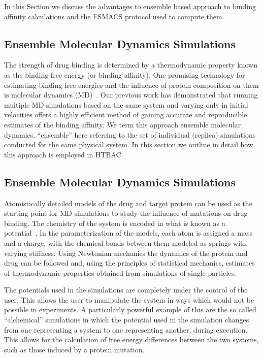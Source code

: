 In this Section we discuss the advantages to ensemble based approach to
binding affinity calculations and the ESMACS protocol used to compute them.

\subsection{Ensemble Molecular Dynamics Simulations}


The strength of drug binding is determined by a thermodynamic property known
as the binding free energy (or binding affinity). One promising technology for
estimating binding free energies and the influence of protein composition on
them is molecular dynamics (MD)~\cite{Karplus2005}. Our previous work
\cite{Sadiq2010, Wan2011} has demonstrated that running multiple MD
simulations based on the same system and varying only in initial velocities
offers a highly efficient method of gaining accurate and reproducible
estimates of the binding affinity. We term this approach ensemble molecular
dynamics, ``ensemble'' here referring to the set of individual (replica)
simulations conducted for the same physical system. In this section we outline
in detail how this approach is employed in HTBAC.

\subsection{Ensemble Molecular Dynamics Simulations}

Atomistically detailed models of the drug and target protein can be used as the 
starting point for MD simulations to
study the influence of mutations on drug binding. The chemistry of the system
is encoded in what is known as a potential~\cite{Karplus2002}. In the
parameterization of the models, each atom is assigned a mass and a charge,
with the chemical bonds between them modeled as springs with varying
stiffness. Using Newtonian mechanics the dynamics of the protein and drug can
be followed and, using the principles of statistical mechanics, estimates of
thermodynamic properties obtained from simulations of single particles.

The potentials used in the simulations are completely under the control of
the user. This allows the user to manipulate the system in ways which would
not be possible in experiments. A particularly powerful example of this are
the so called ``alchemical'' simulations in which the potential used in the
simulation changes from one representing a system to one representing
another, during execution. This allows for the calculation of free energy
differences between the two systems, such as those induced by a protein
mutation.


